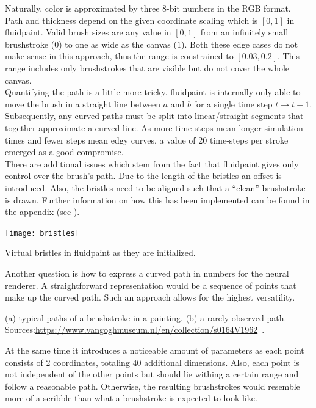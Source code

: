 Naturally, color is approximated by three 8-bit numbers in the RGB format.\\
Path and thickness depend on the given coordinate scaling which is $[0, 1]$ in fluidpaint.
Valid brush sizes are any value in $[0, 1]$ from an infinitely small brushstroke ($0$) to one as wide as the canvas ($1$).
Both these edge cases do not make sense in this approach, thus the range is constrained to $[0.03, 0.2]$.
This range includes only brushstrokes that are visible but do not cover the whole canvas.\\

Quantifying the path is a little more tricky.
fluidpaint is internally only able to move the brush in a straight line between $a$ and $b$ for a single time step $t \rightarrow t+1$.
Subsequently, any curved paths must be split into linear/straight segments that together approximate a curved line.
As more time steps mean longer simulation times and fewer steps mean edgy curves, a value of 20 time-steps per stroke emerged as a good compromise.\\
There are additional issues which stem from the fact that fluidpaint gives only control over the brush's path.
Due to the length of the bristles an offset is introduced.
Also, the bristles need to be aligned such that a ``clean'' brushstroke is drawn.
Further information on how this has been implemented can be found in the appendix (see ).
\begin{marginfigure}
    \texttt{[image: bristles]}
    \caption{Virtual bristles in fluidpaint as they are initialized.}
\end{marginfigure}

Another question is how to express a curved path in numbers for the neural renderer.
A straightforward representation would be a sequence of points that make up the curved path.
Such an approach allows for the highest versatility.
\begin{marginfigure}
    \qquad
    \qquad
    \caption{(a) typical paths of a brushstroke in a painting. (b) a rarely observed path. Sources:\url{https://www.vangoghmuseum.nl/en/collection/s0164V1962}~\cite{zolee}.}
\end{marginfigure}
At the same time it introduces a noticeable amount of parameters as each point consists of 2 coordinates, totaling 40 additional dimensions.
Also, each point is not independent of the other points but should lie withing a certain range and follow a reasonable path. 
Otherwise, the resulting brushstrokes would resemble more of a scribble than what a brushstroke is expected to look like.

